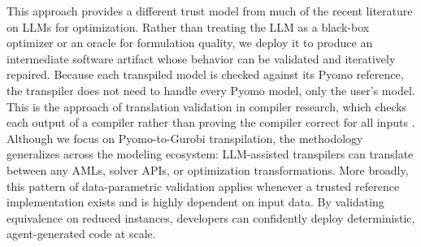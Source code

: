 \documentclass[runningheads]{llncs}
\begin{document}
This approach provides a different trust model from much of the recent literature on LLMs for optimization. Rather than treating the LLM as a black-box optimizer or an oracle for formulation quality, we deploy it to produce an intermediate software artifact whose behavior can be validated and iteratively repaired. Because each transpiled model is checked against its Pyomo reference, the transpiler does not need to handle every Pyomo model, only the user's model. This is the approach of translation validation in compiler research, which checks each output of a compiler rather than proving the compiler correct for all inputs \cite{pnueli1998translation,necula2000translation}. Although we focus on Pyomo-to-Gurobi transpilation, the methodology generalizes across the modeling ecosystem: LLM-assisted transpilers can translate between any AMLs, solver APIs, or optimization transformations. More broadly, this pattern of data-parametric validation applies whenever a trusted reference implementation exists and is highly dependent on input data. By validating equivalence on reduced instances, developers can confidently deploy deterministic, agent-generated code at scale.

\end{document}
